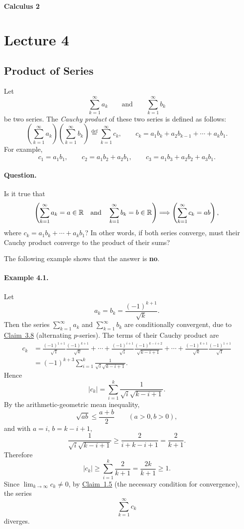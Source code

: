 
{\large\bfseries Calculus 2}

\section{Lecture 4}
\subsection*{Product of Series}

\begin{definition}\label{def:4.1}
Let
\[
\sum_{k=1}^{\infty}a_k
\qquad\text{and}\qquad
\sum_{k=1}^{\infty}b_k
\]
be two series. The \emph{Cauchy product} of these two series is defined as follows:
\[
\left(\sum_{k=1}^{\infty}a_k\right)
\left(\sum_{k=1}^{\infty}b_k\right)
\overset{\mathrm{def}}{=}
\sum_{k=1}^{\infty}c_k,
\qquad
c_k=a_1b_k+a_2b_{k-1}+\cdots+a_kb_1.
\]
For example,
\[
c_1=a_1b_1,
\qquad
c_2=a_1b_2+a_2b_1,
\qquad
c_3=a_1b_3+a_2b_2+a_3b_1.
\]
\end{definition}

\paragraph{Question.}
Is it true that
\[
\left(
\sum_{k=1}^{\infty}a_k=a\in\mathbb{R}
\quad\text{and}\quad
\sum_{k=1}^{\infty}b_k=b\in\mathbb{R}
\right)
\Longrightarrow
\left(
\sum_{k=1}^{\infty}c_k=ab
\right),
\]
where $c_k=a_1b_k+\cdots+a_kb_1$? In other words, if both series converge, must their Cauchy product converge to the product of their sums?

The following example shows that the answer is \textbf{no}.

\paragraph{Example 4.1.}
Let
\[
a_k=b_k=\frac{(-1)^{k+1}}{\sqrt{k}}.
\]
Then the series $\sum_{k=1}^{\infty}a_k$ and $\sum_{k=1}^{\infty}b_k$ are conditionally convergent, due to \hyperref[claim:3.8]{Claim~3.8} (alternating $p$-series). The terms of their Cauchy product are
\begin{align*}
c_k
&=\frac{(-1)^{1+1}}{\sqrt{1}}\frac{(-1)^{k+1}}{\sqrt{k}}
+\cdots+
\frac{(-1)^{i+1}}{\sqrt{i}}\frac{(-1)^{k-i+2}}{\sqrt{k-i+1}}
+\cdots+
\frac{(-1)^{k+1}}{\sqrt{k}}\frac{(-1)^{1+1}}{\sqrt{1}}\\
&=(-1)^{k+3}\sum_{i=1}^{k}\frac{1}{\sqrt{i}\sqrt{k-i+1}}.
\end{align*}
Hence
\[
|c_k|=\sum_{i=1}^{k}\frac{1}{\sqrt{i}\sqrt{k-i+1}}.
\]
By the arithmetic-geometric mean inequality,
\[
\sqrt{ab}\le\frac{a+b}{2}\qquad(a>0,b>0),
\]
and with $a=i$, $b=k-i+1$,
\[
\frac{1}{\sqrt{i}\sqrt{k-i+1}}
\ge\frac{2}{i+k-i+1}
=\frac{2}{k+1}.
\]
Therefore
\[
|c_k|\ge\sum_{i=1}^{k}\frac{2}{k+1}
=\frac{2k}{k+1}\ge1.
\]
Since $\lim_{k\to\infty}c_k\ne0$, by \hyperref[claim:1.5]{Claim~1.5} (the necessary condition for convergence), the series
\[
\sum_{k=1}^{\infty}c_k
\]
diverges.


